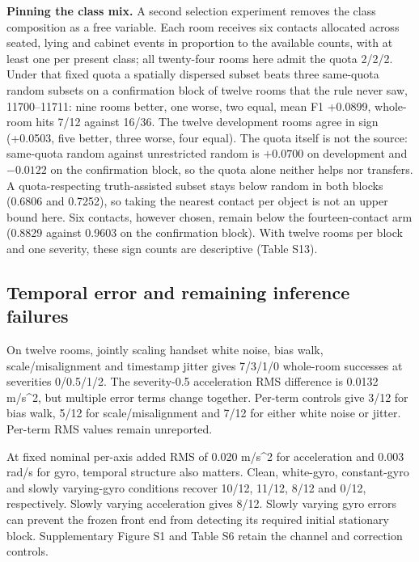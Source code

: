 \documentclass[10pt,twocolumn,letterpaper]{article}
\begin{document}
\textbf{Pinning the class mix.} A second selection experiment removes the
class composition as a free variable. Each room receives six contacts
allocated across seated, lying and cabinet events in proportion to the
available counts, with at least one per present class; all twenty-four
rooms here admit the quota 2/2/2. Under that fixed quota a spatially
dispersed subset beats three same-quota random subsets on a confirmation
block of twelve rooms that the rule never saw, 11700--11711: nine rooms
better, one worse, two equal, mean F1 +0.0899, whole-room hits 7/12
against 16/36. The twelve development rooms agree in sign (+0.0503,
five better, three worse, four equal). The quota itself is not the
source: same-quota random against unrestricted random is $+0.0700$ on
development and $-0.0122$ on the confirmation block, so the quota alone
neither helps nor transfers. A quota-respecting truth-assisted subset stays below random
in both blocks (0.6806 and 0.7252), so taking the nearest contact per
object is not an upper bound here. Six contacts, however chosen, remain
below the fourteen-contact arm (0.8829 against 0.9603 on the
confirmation block). With twelve rooms per block and one severity, these
sign counts are descriptive (Table S13).

\subsection{Temporal error and remaining inference
failures}\label{temporal-error-and-remaining-inference-failures}

On twelve rooms, jointly scaling handset white noise, bias walk,
scale/misalignment and timestamp jitter gives 7/3/1/0 whole-room
successes at severities 0/0.5/1/2. The severity-0.5 acceleration RMS
difference is 0.0132 m/s\^{}2, but multiple error terms change together.
Per-term controls give 3/12 for bias walk, 5/12 for scale/misalignment
and 7/12 for either white noise or jitter. Per-term RMS values remain
unreported.

At fixed nominal per-axis added RMS of 0.020 m/s\^{}2 for acceleration
and 0.003 rad/s for gyro, temporal structure also matters. Clean,
white-gyro, constant-gyro and slowly varying-gyro conditions recover
10/12, 11/12, 8/12 and 0/12, respectively. Slowly varying acceleration
gives 8/12. Slowly varying gyro errors can prevent the frozen front end
from detecting its required initial stationary block. Supplementary
Figure S1 and Table S6 retain the channel and correction controls.
\end{document}

